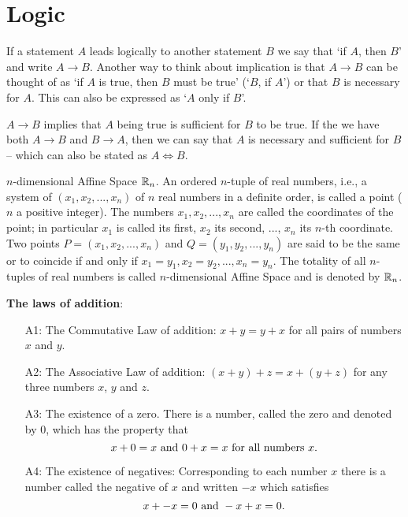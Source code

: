 \section{Logic}

\begin{definition}
If a statement $A$ leads logically to another statement $B$ we say that `if $A$, then $B$' and write $A \rightarrow B$. Another way to think about implication is that $A\rightarrow B$ can be thought of as `if $A$ is true, then $B$ must be true' (`$B$, if $A$') or that $B$ is {\twelveit necessary} for $A$. This can also be expressed as `$A$ {\twelveit only if} $B$'.
\end{definition}

$A\rightarrow B$ implies that $A$ being true is sufficient for $B$ to be true. If the we have both $A\rightarrow B$ and $B\rightarrow A$, then we can say that $A$ is {\twelveit necessary and sufficient} for $B$ -- which can also be stated as $A \iff B$.\\

\begin{definition}
$n$-dimensional Affine Space $\mathbb{R}_n$. An ordered $n$-tuple of real numbers, i.e., a system of $(x_1, x_2, ..., x_n)$ of $n$ real numbers in a definite order, is called a point ($n$ a positive integer). The numbers
$x_1,x_2, ...,x_n$ are called the coordinates of the point; in particular $x_1$ is called its first, $x_2$ its second, ..., $x_n$ its $n$-th coordinate. Two points $P=(x_1,x_2,...,x_n)$ and $Q = (y_1,y_2,...,y_n)$ are said to 
be the {\elevenit same} or to coincide if and only if $x_1 = y_1, x_2 = y_2, ..., x_n = y_n$. The totality of all $n$-tuples of real numbers is called $n$-dimensional Affine Space and is denoted by $\mathbb{R}_n$.
\end{definition}

\begin{definition}{\bf The laws of addition}:\\
\begin{itemize}
\item[A1:] The Commutative Law of addition: $x+ y = y + x$ for all pairs of numbers $x$ and $y$.
\item[A2:] The Associative Law of addition: $(x+y) + z = x + (y+z)$ for any three numbers $x$, $y$ and $z$.
\item[A3:] The existence of a zero. There is a number, called the zero and denoted by $0$, which has the property that
$$ x + 0 = x \hbox{~and~} 0 + x = x \hbox{~for all numbers~} x.$$
\item[A4:] The existence of negatives: Corresponding to each number $x$ there is a number called the negative of $x$ and written $-x$ which satisfies
$$x + -x = 0\hbox{~and~} -x + x = 0.$$
\end{itemize}
\end{definition}

